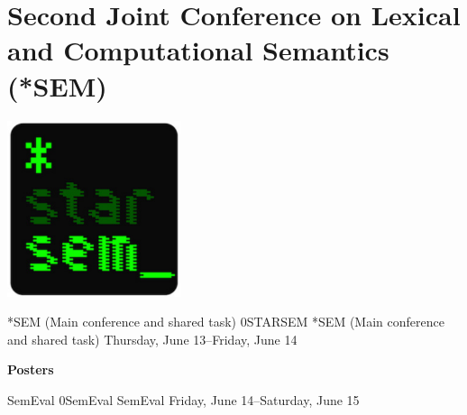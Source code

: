 \chapter{Second Joint Conference on Lexical and Computational Semantics (*SEM)}
\thispagestyle{emptyheader}
\vfill
\begin{center}
  \includegraphics[width=2in]{content/starsem/starsem}
\end{center}
\vfill

\cleardoublepage

\clearpage


\clearpage
\begin{wsschedule}
{*SEM (Main conference and shared task)}
{0}{STARSEM}
{*SEM (Main conference and shared task)}
{Thursday, June 13--Friday, June 14}{\SSemLoc}

\end{wsschedule}

\clearpage



\clearpage
\par\centerline{\bfseries\large Posters}\vspace{1em}\par


\clearpage
\begin{wsschedule}
{SemEval}
{0}{SemEval}
{SemEval}
{Friday, June 14--Saturday, June 15}{\SemEvalLoc}

\end{wsschedule}
